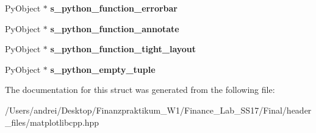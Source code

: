 \begin{DoxyCompactItemize}
Py\+Object $\ast$ {\bfseries s\+\_\+python\+\_\+function\+\_\+errorbar}
\item 
\mbox{\label{structmatplotlibcpp_1_1detail_1_1__interpreter_af63d49cff0820f3324b12da812c9a266}} 
Py\+Object $\ast$ {\bfseries s\+\_\+python\+\_\+function\+\_\+annotate}
\item 
\mbox{\label{structmatplotlibcpp_1_1detail_1_1__interpreter_a72965ea88b282bf62b41ca126341d9a8}} 
Py\+Object $\ast$ {\bfseries s\+\_\+python\+\_\+function\+\_\+tight\+\_\+layout}
\item 
\mbox{\label{structmatplotlibcpp_1_1detail_1_1__interpreter_aaedba936be3a7e8fbcc528991ccace2c}} 
Py\+Object $\ast$ {\bfseries s\+\_\+python\+\_\+empty\+\_\+tuple}
\end{DoxyCompactItemize}


The documentation for this struct was generated from the following file\+:\begin{DoxyCompactItemize}
\item 
/\+Users/andrei/\+Desktop/\+Finanzpraktikum\+\_\+\+W1/\+Finance\+\_\+\+Lab\+\_\+\+S\+S17/\+Final/header\+\_\+files/matplotlibcpp.\+hpp\end{DoxyCompactItemize}
